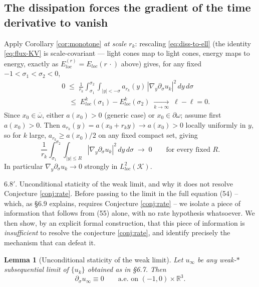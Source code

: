 \documentclass[11pt,letterpaper]{amsart}
\newtheorem{lemma}[theorem]{Lemma}
\begin{document}
\subsection{The dissipation forces the gradient of the time derivative to vanish}

Apply Corollary \ref{cor:monotone} \emph{at scale $r_k$}: rescaling \eqref{eq:diss-to-ell} (the identity \eqref{eq:flux-KV} is scale-covariant --- light cones map to light cones, energy maps to energy, exactly as $E_{loc}^{(r)}=E_{loc}(r\,\cdot)$ above) gives, for any fixed $-1<\sigma_1<\sigma_2<0$,
\begin{eqnarray*}
&&0 \;\le\; \frac1{r_k}\int_{\sigma_1}^{\sigma_2}\!\!\int_{|y|<-\sigma} a_{r_k}(y)\,|\nabla_y\partial_\sigma u_k|^2\,dy\,d\sigma \;\\
&&\quad \le\; E^k_{loc}(\sigma_1) - E^k_{loc}(\sigma_2) \;\xrightarrow[k\to\infty]{}\; \ell-\ell=0.
\end{eqnarray*}
Since $x_0\in\overline\omega$, either $a(x_0)>0$ (generic case) or $x_0\in\partial\omega$; assume first $a(x_0)>0$. Then $a_{r_k}(y)=a(x_0+r_ky)\to a(x_0)>0$ locally uniformly in $y$, so for $k$ large, $a_{r_k}\ge a(x_0)/2$ on any fixed compact set, giving
\begin{equation}\label{eq:qualitative-vanishing}
\frac1{r_k}\int_{\sigma_1}^{\sigma_2}\int_{|y|\le R} |\nabla_y\partial_\sigma u_k|^2\,dy\,d\sigma \;\longrightarrow\; 0 \qquad \text{for every fixed } R.
\end{equation}
In particular $\nabla_y\partial_\sigma u_k \to 0$ strongly in $L^2_{loc}(\mathcal K)$.


6.8$'$. Unconditional staticity of the weak limit, and why it does not
resolve Conjecture \ref{conj:rate}. Before passing to the limit in the full equation
(54) -- which, as \S6.9 explains, requires Conjecture \ref{conj:rate} -- we isolate a
piece of information that follows from (55) alone, with no rate
hypothesis whatsoever. We then show, by an explicit formal construction,
that this piece of information is \emph{insufficient} to resolve the
conjecture \ref{conj:rate}, and identify precisely the mechanism that can defeat it.

\begin{lemma}[Unconditional staticity of the weak limit]
\label{lem:static}
Let $u_\infty$ be any weak-$*$ subsequential limit of $\{u_k\}$ obtained
as in \S6.7. Then
\[
\partial_\sigma u_\infty \equiv 0 \qquad \text{a.e. on } (-1,0)\times\mathbb R^3.
\]
\end{lemma}
\end{document}
